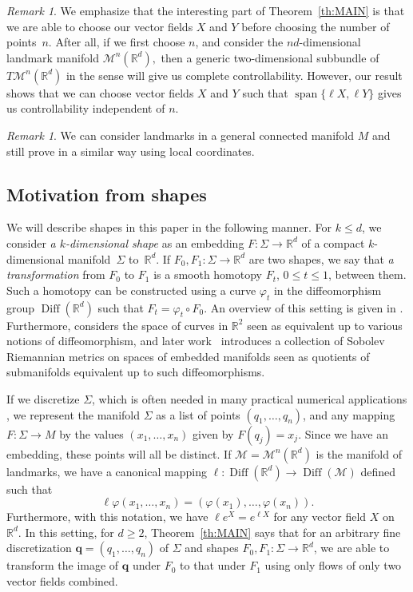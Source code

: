 \documentclass[10pt]{amsart}
\newcounter{dummy} \numberwithin{dummy}{section}
\theoremstyle{remark}
\newtheorem{remark}[dummy]{Remark}
\newcommand{\R}{\mathbb{R}}
\DeclareMathOperator{\spn}{span}
\DeclareMathOperator{\Diff}{Diff}
\newcommand{\LM}{\mathcal{M}}
\numberwithin{equation}{section}
\begin{document}
\begin{remark}
 We emphasize that the interesting part of Theorem~\ref{th:MAIN} is that we are able to choose our vector fields $X$ and $Y$ before choosing the number of points~$n$. After all, if we first choose $n$, and consider the $nd$-dimensional landmark manifold $\LM^n(
 \mathbb{R}^d),$
then a generic two-dimensional subbundle of $T\LM^n(\mathbb{R}^d)$ in the sense \cite{Lobry,Mon93} will give us complete controllability. However, our result shows that we can choose vector fields $X$ and $Y$ such that $\spn\{ \ell X, \ell Y\}$ gives us controllability independent of $n$. 
\end{remark}


\begin{remark}
We can consider landmarks in a general connected manifold $M$ and still prove  in a similar way using local coordinates.
\end{remark}


\subsection{Motivation from shapes}
\label{sec:Shapes}
We will describe shapes in this paper in the following manner. For $k \leq d$, we consider \emph{a $k$-dimensional shape} as an embedding $F: \Sigma \to \mathbb{R}^d$ of a compact $k$-dimensional manifold~$\Sigma$ to~$\mathbb{R}^d$. If $F_0, F_1: \Sigma \to \mathbb{R}^d$ are two shapes, we say that \emph{a transformation} from $F_0$ to $F_1$ is a smooth homotopy $F_t$, $0 \leq t \leq 1$, between them. Such a homotopy can be constructed using a curve $\varphi_t$ in the diffeomorphism group $\Diff(\mathbb{R}^d)$ such that $F_t =\varphi_t \circ F_0$. An overview of this setting is given in \cite{KrieglMichor-1997}. Furthermore, \cite{MichorMumford-2006, MichorMumford-2007} considers the space of curves in $\R^2$ seen as equivalent up to various notions of diffeomorphism, and later work~\cite{BauerHarmsMichor-2010} introduces a collection of Sobolev Riemannian metrics on spaces of embedded manifolds seen as quotients of submanifolds equivalent up to such diffeomorphisms.

If we discretize $\Sigma$, which is often needed in many practical numerical applications \cite{JoshiMiller-2000}, we represent the manifold $\Sigma$ as a list of points $(q_1, \dots, q_n )$, and any mapping $F: \Sigma \to M$ by the values $( x_1, \dots, x_n)$ given by $F(q_j) = x_j$. Since we have an embedding, these points will all be distinct. If $\LM = \LM^n(\mathbb{R}^d)$ is the manifold of landmarks, we have a canonical mapping  $\ell: \Diff(\mathbb{R}^d) \to \Diff(\LM)$ defined such that
$$\ell \varphi(x_1, \dots, x_n) = (\varphi(x_1), \dots, \varphi(x_n)).$$
Furthermore, with this notation, we have $\ell e^{X} = e^{\ell X}$ for any vector field $X$ on $\mathbb{R}^d$. In this setting, for $d \geq 2$, Theorem~\ref{th:MAIN} says that for an arbitrary fine discretization $\mathbf{q} = (q_1, \dots, q_n)$ of $\Sigma$ and shapes $F_0, F_1: \Sigma \to \mathbb{R}^d$, we are able to transform the image of $\mathbf{q}$ under $F_0$ to that under $F_1$ using only flows of only two vector fields combined.
\end{document}
